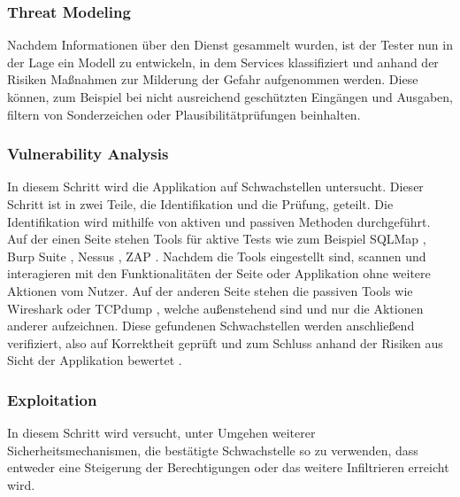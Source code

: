     \subsubsection{\glqq Threat Modeling\grqq{}}
        Nachdem Informationen über den Dienst gesammelt wurden, ist der Tester nun in der Lage ein Modell zu entwickeln, in dem Services klassifiziert und anhand der Risiken Maßnahmen zur Milderung der Gefahr aufgenommen werden. Diese können, zum Beispiel bei nicht ausreichend geschützten Eingängen und Ausgaben, filtern von Sonderzeichen oder Plausibilitätprüfungen beinhalten.
    \subsubsection{\glqq Vulnerability Analysis\grqq{}}
        In diesem Schritt wird die Applikation auf Schwachstellen untersucht. 
        Dieser Schritt ist in zwei Teile, die Identifikation und die Prüfung, geteilt.
        Die Identifikation wird mithilfe von aktiven und passiven Methoden durchgeführt.
        Auf der einen Seite stehen Tools für aktive Tests wie zum Beispiel 
        SQLMap \cite{damele_stampar_2014}, 
        Burp Suite \cite{LozanoCarlosA.author2019Hapt}, %
        Nessus \cite{BealeJay2008Nna}, %
        \ac{ZAP} \cite{bennetts2013owasp}. %
        Nachdem die Tools eingestellt sind, scannen und interagieren mit den Funktionalitäten der Seite oder Applikation ohne weitere Aktionen vom Nutzer.
        Auf der anderen Seite stehen die passiven Tools wie Wireshark oder TCPdump \cite{tcpdump_2010}, welche außenstehend sind und nur die Aktionen anderer aufzeichnen. 
        Diese gefundenen Schwachstellen werden anschließend verifiziert, also auf Korrektheit geprüft und zum Schluss anhand der Risiken aus Sicht der Applikation bewertet \cite{hayes_2012}.
    \subsubsection{\glqq Exploitation\grqq{}}
        In diesem Schritt wird versucht, unter Umgehen weiterer Sicherheitsmechanismen, die bestätigte Schwachstelle so zu verwenden, dass entweder eine Steigerung der Berechtigungen oder das weitere Infiltrieren erreicht wird.
